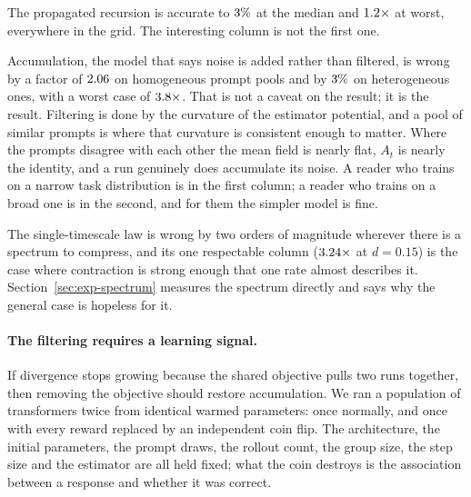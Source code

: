 \begin{table}[t]
  \centering
  
  \caption{Predicted against measured divergence between independent runs in the enumerable
  policy, with $400$ trajectories per setting. Error is the ratio of predicted to measured,
  summarised as $\exp$ of the median absolute log ratio. $d$ is the diversity of the prompt pool:
  low $d$ means the prompts are alike, which is where the objective supplies the most curvature.}
  \label{tab:propagation}
\end{table}

The propagated recursion is accurate to $3\%$ at the median and $1.2\times$ at
worst, everywhere in the grid. The interesting column is not the first one.

Accumulation, the model that says noise is added rather than filtered, is wrong by a factor
of $2.06$ on homogeneous prompt pools and by $3\%$ on heterogeneous ones, with a worst case of
$3.8\times$. That is not a caveat on the result; it is the result. Filtering is done by the
curvature of the estimator potential, and a pool of similar prompts is where that curvature is
consistent enough to matter. Where the prompts disagree with each other the mean field is nearly
flat, $A_t$ is nearly the identity, and a run genuinely does accumulate its noise. A reader who
trains on a narrow task distribution is in the first column; a reader who trains on a broad one is
in the second, and for them the simpler model is fine.

The single-timescale law is wrong by two orders of magnitude wherever there is a spectrum to
compress, and its one respectable column ($3.24\times$ at $d = 0.15$) is the case where contraction
is strong enough that one rate almost describes it. Section~\ref{sec:exp-spectrum} measures the
spectrum directly and says why the general case is hopeless for it.

\paragraph{The filtering requires a learning signal.} If divergence stops growing because the
shared objective pulls two runs together, then removing the objective should restore
accumulation. We ran a population of transformers twice from identical warmed parameters: once
normally, and once with every reward replaced by an independent coin flip. The architecture, the
initial parameters, the prompt draws, the rollout count, the group size, the step size and the
estimator are all held fixed; what the coin destroys is the association between a response and
whether it was correct.

